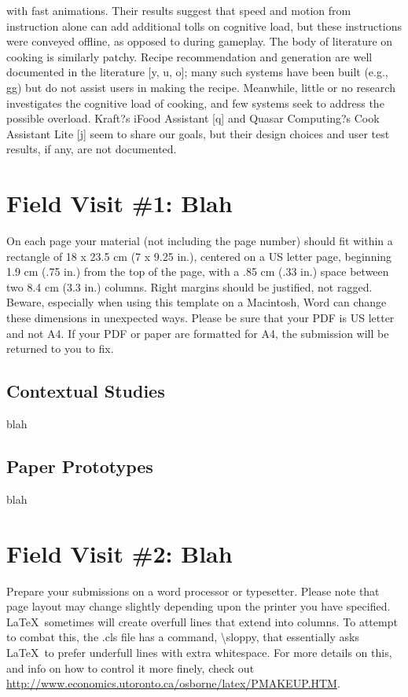 \documentclass{sigchi}
\begin{document}
with fast animations. Their results suggest that speed and motion from instruction
alone can add additional tolls on cognitive load, but these instructions were conveyed
offline, as opposed to during gameplay.
The body of literature on cooking is similarly patchy. Recipe recommendation and
generation are well documented in the literature [y, u, o]; many such systems have
been built (e.g., gg) but do not assist users in making the recipe. Meanwhile, little or no
research investigates the cognitive load of cooking, and few systems seek to address
the possible overload. Kraft?s iFood Assistant [q] and Quasar Computing?s Cook
Assistant Lite [j] seem to share our goals, but their design choices and user test results,
if any, are not documented.

\section{Field Visit \#1: Blah}

On each page your material (not including the page number) should fit
within a rectangle of 18 x 23.5 cm (7 x 9.25 in.), centered on a US
letter page, beginning 1.9 cm (.75 in.) from the top of the page, with
a .85 cm (.33 in.) space between two 8.4 cm (3.3 in.) columns.  Right
margins should be justified, not ragged. Beware, especially when using
this template on a Macintosh, Word can change these dimensions in
unexpected ways. Please be sure that your PDF is US letter and not
A4. If your PDF or paper are formatted for A4, the submission will be
returned to you to fix.

\subsection{Contextual Studies}
blah

\subsection{Paper Prototypes}
blah

\section{Field Visit \#2: Blah}

Prepare your submissions on a word processor or typesetter.  Please
note that page layout may change slightly depending upon the printer
you have specified.  \LaTeX\ sometimes will create overfull lines
that extend into columns.  To attempt to combat this, the .cls
file has a command, {\textbackslash}sloppy, that essentially asks
\LaTeX\ to prefer underfull lines with extra whitespace.  For more
details on this, and info on how to control it more finely, check out
{\url{http://www.economics.utoronto.ca/osborne/latex/PMAKEUP.HTM}}.
\end{document}
